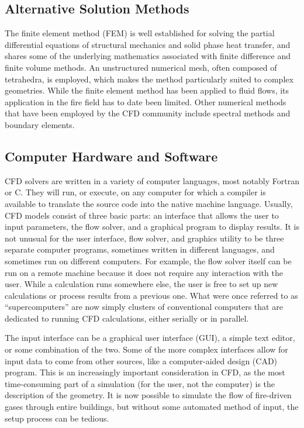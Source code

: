 \documentclass[graybox]{svmult}
\begin{document}
\subsection{Alternative Solution Methods}

The finite element method (FEM) is well established for solving the partial differential equations of structural mechanics and solid phase heat transfer, and shares some of the underlying mathematics associated with finite difference and finite volume methods. An unstructured numerical mesh, often composed of tetrahedra, is employed, which makes the method particularly suited to complex geometries. While the finite element method has been applied to fluid flows, its application in the fire field has to date been limited. Other numerical methods that have been employed by the CFD community include spectral methods and boundary elements.



\subsection{Computer Hardware and Software}

CFD solvers are written in a variety of computer languages, most notably Fortran or C. They will run, or execute, on any computer for which a compiler is available to translate the source code into the native machine language. Usually, CFD models consist of three basic parts: an interface that allows the user to input parameters, the flow solver, and a graphical program to display results. It is not unusual for the user interface, flow solver, and graphics utility to be three separate computer programs, sometimes written in different languages, and sometimes run on different computers. For example, the flow solver itself can be run on a remote machine because it does not require any interaction with the user. While a calculation runs somewhere else, the user is free to set up new calculations or process results from a previous one. What were once referred to as ``supercomputers'' are now simply clusters of conventional computers that are dedicated to running CFD calculations, either serially or in parallel.

The input interface can be a graphical user interface (GUI), a simple text editor, or some combination of the two. Some of the more complex interfaces allow for input data to come from other sources, like a computer-aided design (CAD) program. This is an increasingly important consideration in CFD, as the most time-consuming part of a simulation (for the user, not the computer) is the description of the geometry. It is now possible to simulate the flow of fire-driven gases through entire buildings, but without some automated method of input, the setup process can be tedious.
\end{document}
